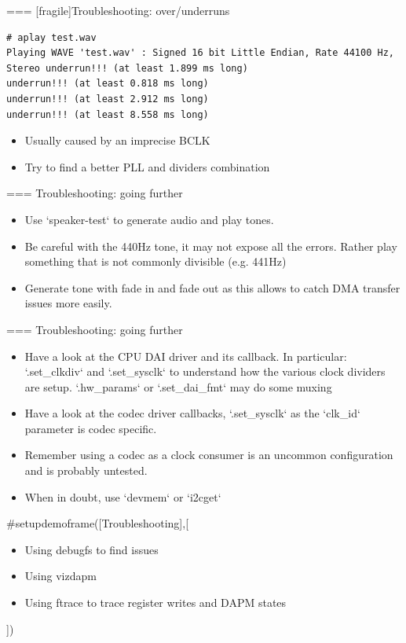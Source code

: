 === [fragile]{Troubleshooting: over/underruns}
  \begin{block}{}
    \fontsize{10}{10}\selectfont
    \begin{verbatim}
# aplay test.wav 
Playing WAVE 'test.wav' : Signed 16 bit Little Endian, Rate 44100 Hz, Stereo underrun!!! (at least 1.899 ms long)
underrun!!! (at least 0.818 ms long)
underrun!!! (at least 2.912 ms long)
underrun!!! (at least 8.558 ms long)
    \end{verbatim}
  \end{block}
  \begin{itemize}
  \item Usually caused by an imprecise BCLK
  \item Try to find a better PLL and dividers combination
  \end{itemize}


=== {Troubleshooting: going further}
  \begin{itemize}
  \item Use `speaker-test` to generate audio and play tones.
  \item Be careful with the 440Hz tone, it may not expose all the
    errors. Rather play something that is not commonly divisible (e.g.
    441Hz)
  \item Generate tone with fade in and fade out as this allows to
    catch DMA transfer issues more easily.
  \end{itemize}


=== {Troubleshooting: going further}
  \begin{itemize}
  \item Have a look at the CPU DAI driver and its callback. In
    particular: `.set_clkdiv` and `.set_sysclk` to
    understand how the various clock dividers are setup.
    `.hw_params` or `.set_dai_fmt` may do some muxing
  \item Have a look at the codec driver callbacks, `.set_sysclk`
    as the `clk_id` parameter is codec specific.
  \item Remember using a codec as a clock consumer is an uncommon
    configuration and is probably untested.
  \item When in doubt, use `devmem` or `i2cget`
  \end{itemize}


#setupdemoframe([Troubleshooting],[
  \begin{itemize}
  \item Using debugfs to find issues
  \item Using vizdapm
  \item Using ftrace to trace register writes and DAPM states
  \end{itemize}
])
